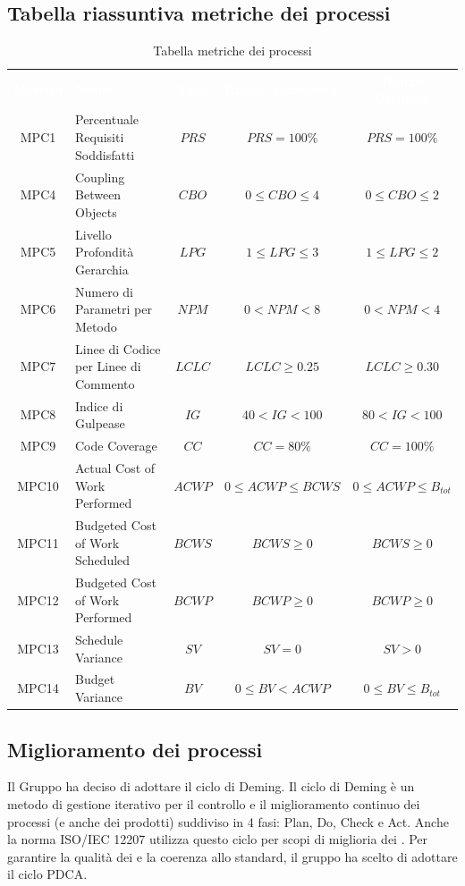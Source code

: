 \subsection{Tabella riassuntiva metriche dei processi}
    \renewcommand{\arraystretch}{1.5}
    \begin{longtable}{ c C{4cm} c c c}
    \caption{Tabella metriche dei processi}\\
    \textcolor{white}{\textbf{Metrica}} & \textcolor{white}{\textbf{Nome}} & \textcolor{white}{\textbf{Sigla}} & \textcolor{white}{\textbf{Range Accettabile}} & \textcolor{white}{\textbf{Range Ottimale}}\\
    MPC1 & Percentuale Requisiti Soddisfatti & $PRS$ & $PRS = 100\%$ & $PRS = 100\%$ \\
    MPC4 & Coupling Between Objects & $CBO$ & $0 \leq CBO \leq 4$ & $0 \leq CBO \leq 2$ \\
    MPC5 & Livello Profondità Gerarchia & $LPG$ &  $1 \leq LPG \leq 3$ &  $1 \leq LPG \leq 2$ \\
    MPC6 & Numero di Parametri per Metodo & $NPM$ & $0 < NPM < 8$ & $ 0 < NPM < 4$ \\
    MPC7 & Linee di Codice per Linee di Commento & $LCLC$ & $LCLC \geq 0.25$ & $LCLC \geq 0.30$ \\
    MPC8 & Indice di Gulpease & $IG$ & $40 < IG < 100$ & $80 < IG < 100$ \\
    MPC9 & Code Coverage & $CC$ & $CC = 80\%$ & $CC = 100\%$  \\
    MPC10 & Actual Cost of Work Performed & $ACWP$ & $0 \leq ACWP \leq BCWS$ & $0 \leq ACWP \leq B_{tot}$ \\
    MPC11 & Budgeted Cost of Work Scheduled & $BCWS$ & $BCWS \geq 0$ &  $BCWS \geq 0$ \\
    MPC12 & Budgeted Cost of Work Performed & $BCWP$ & $BCWP \geq 0$ & $BCWP \geq 0$ \\
    MPC13 & Schedule Variance & $SV$ & $SV = 0$ & $SV > 0$  \\	
    MPC14 & Budget Variance & $BV$ & $0 \leq BV < ACWP$ & $0 \leq BV \leq B_{tot}$  \\
    \end{longtable}
\subsection{Miglioramento dei processi}
Il Gruppo \Gruppo{} ha deciso di adottare il ciclo di Deming. Il ciclo di Deming è un metodo di gestione iterativo per il controllo e il miglioramento continuo dei processi (e anche dei prodotti) suddiviso in 4 fasi: Plan, Do, Check e Act. 
Anche la norma ISO/IEC 12207 utilizza questo ciclo per scopi di miglioria dei . Per garantire la qualità dei  e la coerenza allo standard, il gruppo \Gruppo{}  
ha scelto di adottare il ciclo PDCA.

